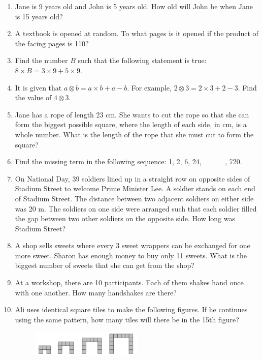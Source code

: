 \documentclass[11pt]{scrartcl}
\begin{document}
\begin{enumerate}
    \item Jane is 9 years old and John is 5 years old. How old will John be when Jane is 15 years old?
    
    \item A textbook is opened at random. To what pages is it opened if the product of the facing pages is 110?
    
    \item Find the number \( B \) such that the following statement is true: \( 8 \times B = 3 \times 9 + 5 \times 9 \).
    
    \item It is given that \( a \otimes b = a \times b + a - b \). For example, \( 2 \otimes 3 = 2 \times 3 + 2 - 3 \). Find the value of \( 4 \otimes 3 \).
    
    \item Jane has a rope of length 23 cm. She wants to cut the rope so that she can form the biggest possible square, where the length of each side, in cm, is a whole number. What is the length of the rope that she must cut to form the square?
    
    \item Find the missing term in the following sequence: 1, 2, 6, 24, \_\_\_\_, 720.
    
    \item On National Day, 39 soldiers lined up in a straight row on opposite sides of Stadium Street to welcome Prime Minister Lee. A soldier stands on each end of Stadium Street. The distance between two adjacent soldiers on either side was 20 m. The soldiers on one side were arranged such that each soldier filled the gap between two other soldiers on the opposite side. How long was Stadium Street?
    
    \item A shop sells sweets where every 3 sweet wrappers can be exchanged for one more sweet. Sharon has enough money to buy only 11 sweets. What is the biggest number of sweets that she can get from the shop?
    
    \item At a workshop, there are 10 participants. Each of them shakes hand once with one another. How many handshakes are there?
    
    \item Ali uses identical square tiles to make the following figures. If he continues using the same pattern, how many tiles will there be in the 15th figure?
    \begin{figure}[h]
        \centering
        \includegraphics[width=0.5\textwidth]{StarGen/G7-8 and G3-4/diagram.png}
    \end{figure}
    

\end{enumerate}
\end{document}
